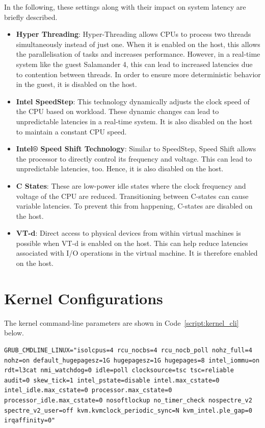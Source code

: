 \documentclass[MMR,Master,english]{twbook}
\begin{document}
\noindent In the following, these settings along with their impact on system latency are briefly described.

\begin{itemize}
	\item \textbf{Hyper Threading}: Hyper-Threading allows CPUs to process two threads simultaneously instead of just one. When it is enabled on the host, this allows the parallelisation of tasks and increases performance. However, in a real-time system like the guest Salamander 4, this can lead to increased latencies due to contention between threads. In order to ensure more deterministic behavior in the guest, it is disabled on the host.
	\item \textbf{Intel SpeedStep}: This technology dynamically adjusts the clock speed of the CPU based on workload. These dynamic changes can lead to unpredictable latencies in a real-time system. It is also disabled on the host to maintain a constant CPU speed.
	\item \textbf{Intel® Speed Shift Technology}: Similar to SpeedStep, Speed Shift allows the processor to directly control its frequency and voltage. This can lead to unpredictable latencies, too. Hence, it is also disabled on the host.
	\item \textbf{C States}: These are low-power idle states where the clock frequency and voltage of the CPU are reduced. Transitioning between C-states can cause variable latencies. To prevent this from happening, C-states are disabled on the host.
	\item \textbf{VT-d}: Direct access to physical devices from within virtual machines is possible when VT-d is enabled on the host. This can help reduce latencies associated with I/O operations in the virtual machine. It is therefore enabled on the host.
\end{itemize}




\section{Kernel Configurations}\label{sec:kernel_configurations}

The kernel command-line parameters are shown in Code~\ref{script:kernel_cli} below.

\vspace{1em}
\begin{minipage}{0.95\columnwidth}
	\begin{lstlisting}[name={Kernel Configuration},label={script:kernel_cli}]
		GRUB_CMDLINE_LINUX="isolcpus=4 rcu_nocbs=4 rcu_nocb_poll nohz_full=4 nohz=on default_hugepagesz=1G hugepagesz=1G hugepages=8 intel_iommu=on rdt=l3cat nmi_watchdog=0 idle=poll clocksource=tsc tsc=reliable audit=0 skew_tick=1 intel_pstate=disable intel.max_cstate=0 intel_idle.max_cstate=0 processor.max_cstate=0 processor_idle.max_cstate=0 nosoftlockup no_timer_check nospectre_v2 spectre_v2_user=off kvm.kvmclock_periodic_sync=N kvm_intel.ple_gap=0 irqaffinity=0"
\end{lstlisting}
\end{minipage}
\end{document}
